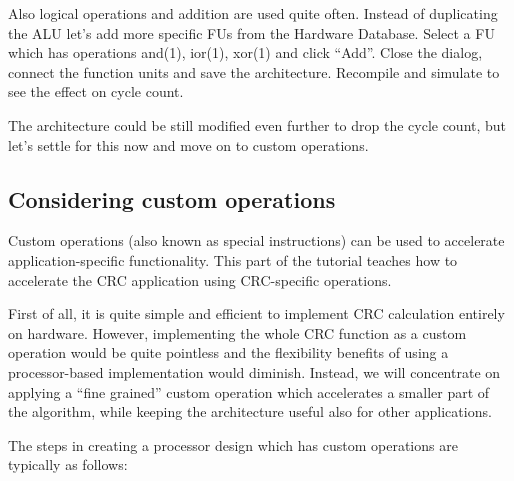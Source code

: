 \documentclass[twoside]{tceusermanual}
\begin{document}
Also logical operations and addition are used quite often. Instead
of duplicating the ALU let's add more specific FUs from the Hardware Database.
Select a FU which has operations and(1), ior(1), xor(1) and click ``Add''. Close the dialog,
connect the function units and save the architecture. Recompile and simulate
to see the effect on cycle count.

The architecture could be still modified even further to drop the cycle count,
but let's settle for this now and move on to custom operations.


\subsection{Considering custom operations}
\label{ssec:anal_custom}

Custom operations (also known as special instructions) can be used to accelerate
application-specific functionality. This part of the tutorial teaches how to
accelerate the CRC application using CRC-specific operations.


First of all, it is quite simple and efficient to implement CRC
calculation entirely on hardware. However, implementing the whole CRC
function as a custom operation would be quite pointless and the
flexibility benefits of using a processor-based implementation would diminish.
Instead, we will concentrate on applying a ``fine grained'' custom
operation which accelerates a smaller part of the algorithm, while
keeping the architecture useful also for other applications.

The steps in creating a processor design which has custom operations
are typically as follows:
\end{document}
